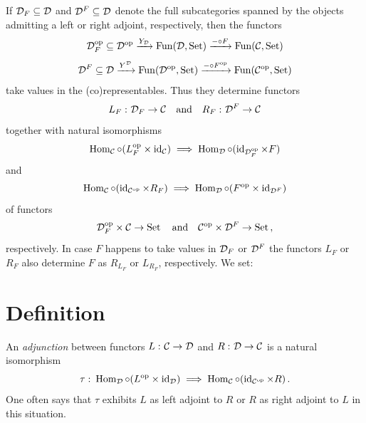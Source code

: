         If $\mathcal{D}_F \subseteq \mathcal{D}$ and $\mathcal{D}^F \subseteq \mathcal{D}$ denote the full subcategories spanned by the objects admitting a left or right adjoint, respectively, then the functors
        \begin{equation*}
            \mathcal{D}^{\operatorname{op}}_F \subseteq \mathcal{D}^{\operatorname{op}} \xrightarrow{Y_{\mathcal{D}}} \operatorname{Fun}(\mathcal{D}, \operatorname{Set}) \xrightarrow{- \circ F} \operatorname{Fun}(\mathcal{C}, \operatorname{Set})
        \end{equation*}
        \begin{equation*}
            \mathcal{D}^F \subseteq \mathcal{D} \xrightarrow{Y^{\mathcal{D}}} \operatorname{Fun}(\mathcal{D}^{\operatorname{op}}, \operatorname{Set}) \xrightarrow{- \circ F^{\operatorname{op}}} \operatorname{Fun}(\mathcal{C}^{\operatorname{op}}, \operatorname{Set})
        \end{equation*}
        take values in the (co)representables. Thus they determine functors
        \begin{equation*}
            L_F \,\colon \mathcal{D}_F \to \mathcal{C} \quad \text{and} \quad R_F \,\colon \mathcal{D}^F \to \mathcal{C}
        \end{equation*}
        together with natural isomorphisms
        \begin{equation*}
            \operatorname{Hom}_{\mathcal{C}} \circ (L^{\operatorname{op}}_F \times \operatorname{id}_{\mathcal{C}}) \implies \operatorname{Hom}_{\mathcal{D}} \circ (\operatorname{id}_{\mathcal{D}^{\operatorname{op}}_F} \times F)
        \end{equation*}
        and
        \begin{equation*}
            \operatorname{Hom}_{\mathcal{C}} \circ (\operatorname{id}_{\mathcal{C}^{\operatorname{op}}} \times R_F) \implies \operatorname{Hom}_{\mathcal{D}} \circ (F^{\operatorname{op}} \times \operatorname{id}_{\mathcal{D}^F})
        \end{equation*}
        of functors 
        \begin{equation*}
            \mathcal{D}^{\operatorname{op}}_F \times \mathcal{C} \to \operatorname{Set} \quad \text{and} \quad \mathcal{C}^{\operatorname{op}} \times \mathcal{D}^F \to \operatorname{Set} \,,
        \end{equation*}
        respectively. In case $F$ happens to take values in $\mathcal{D}_F$ or $\mathcal{D}^F$ the functors $L_F$ or $R_F$ also determine $F$ as $R_{L_F}$ or $L_{R_F}$, respectively. We set:
    \section{Definition}
        An \emph{adjunction} between functors $L \,\colon \mathcal{C} \to \mathcal{D}$ and $R \,\colon \mathcal{D} \to \mathcal{C}$ is a natural isomorphism
        \begin{equation*}
            \tau \,\colon \operatorname{Hom}_{\mathcal{D}} \circ (L^{\operatorname{op}} \times \operatorname{id}_{\mathcal{D}}) \implies \operatorname{Hom}_{\mathcal{C}} \circ (\operatorname{id}_{\mathcal{C}^{\operatorname{op}}} \times R) \,.
        \end{equation*}
        One often says that $\tau$ exhibits $L$ as left adjoint to $R$ or $R$ as right adjoint to $L$ in this situation.
